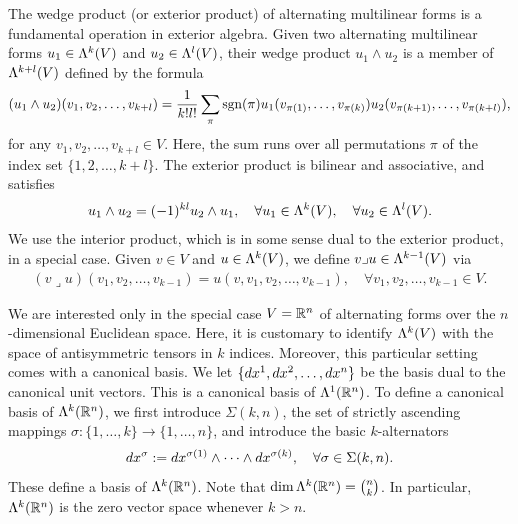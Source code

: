 \documentclass[10pt,a4paper]{article}
\begin{document}
The wedge product (or exterior product) of alternating multilinear forms is a fundamental operation in exterior algebra. 
Given two alternating multilinear forms \( u_1 \in \Lambda^{k}(V) \) and \( u_2 \in \Lambda^{l}(V) \), 
their wedge product \( u_1 \wedge u_2 \) is a member of $\Lambda^{k+l}(V)$
defined by the formula 
\begin{gather*}
    (u_1 \wedge u_2)(v_1, v_2, \ldots, v_{k+l}) 
    = 
    \frac{1}{k! l!} 
    \sum_{ \pi } 
    \operatorname{sgn}(\pi) 
    u_1( v_{\pi(  1)}, \ldots, v_{\pi(k  )} ) 
    u_2( v_{\pi(k+1)}, \ldots, v_{\pi(k+l)} ),
\end{gather*}
for any \( v_1, v_2, \ldots, v_{k+l} \in V \).
Here, the sum runs over all permutations $\pi$ of the index set \(\{ 1, 2, \ldots, k+l \}\).
The exterior product is bilinear and associative, and satisfies 
\begin{align*}
    u_1 \wedge u_2 = (-1)^{kl} u_2 \wedge u_1,
    \quad 
    \forall u_1 \in \Lambda^{k}(V),
    \quad 
    \forall u_2 \in \Lambda^{l}(V).
\end{align*}
We use the interior product, which is in some sense dual to the exterior product, in a special case. Given $v \in V$ and $u \in \Lambda^{k}(V)$, we define $v \lrcorner u \in \Lambda^{k-1}(V)$ via 
\begin{align*}
    (v \lrcorner u)( v_1, v_2, \ldots, v_{k-1} ) = u( v, v_1, v_2, \ldots, v_{k-1} ),
    \quad 
    \forall v_1, v_2, \ldots, v_{k-1} \in V.
\end{align*}

We are interested only in the special case $V = {\mathbb R}^{n}$ of alternating forms over the $n$-dimensional Euclidean space. 
Here, it is customary to identify $\Lambda^{k}(V)$ with the space of antisymmetric tensors in $k$ indices. 
Moreover, this particular setting comes with a canonical basis. 
We let \(\{dx^1, dx^2, \ldots, dx^{n}\}\) be the basis dual to the canonical unit vectors.
This is a canonical basis of $\Lambda^{1}({\mathbb R}^{n})$. 
To define a canonical basis of $\Lambda^{k}({\mathbb R}^{n})$, 
we first introduce $\Sigma(k,n)$, the set of strictly ascending mappings $\sigma : \{1,\dots,k\} \rightarrow \{1,\dots,n\}$,
and introduce the basic $k$-alternators 
\begin{align*}
    dx^{\sigma} := dx^{\sigma(1)} \wedge \dots \wedge dx^{\sigma(k)}, 
    \quad 
    \forall \sigma \in \Sigma(k,n). 
\end{align*}
These define a basis of $\Lambda^{k}({\mathbb R}^{n})$.
Note that 
$\dim \Lambda^{k}({\mathbb R}^{n}) = \binom{n}{k}$. 
In particular, $\Lambda^{k}({\mathbb R}^{n})$ is the zero vector space whenever $k > n$.
\end{document}
